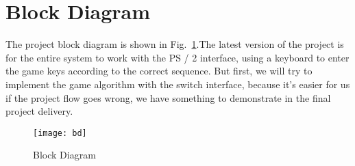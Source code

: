 \section{Block Diagram}

The project block diagram is shown in Fig.~\ref{fig:bd}.The latest version of the project is for the entire system to work with the PS / 2 interface, using a keyboard to enter the game keys according to the correct sequence. But first, we will try to implement the game algorithm with the switch interface, because it's easier for us if the project flow goes wrong, we have something to demonstrate in the final project delivery.


\begin{figure}[!htbp]
    \centerline{\texttt{[image: bd]}}
    \vspace{0cm}\caption{Block Diagram}
    \label{fig:bd}
\end{figure}


